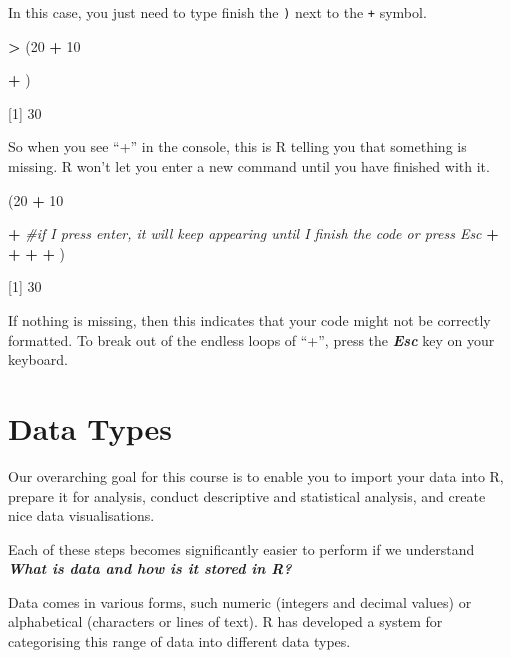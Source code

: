 \documentclass[
]{book}
\newenvironment{Shaded}{\begin{snugshade}}{\end{snugshade}}
\newcommand{\CommentTok}[1]{\textcolor[rgb]{0.56,0.35,0.01}{\textit{#1}}}
\newcommand{\DecValTok}[1]{\textcolor[rgb]{0.00,0.00,0.81}{#1}}
\newcommand{\NormalTok}[1]{#1}
\newcommand{\SpecialCharTok}[1]{\textcolor[rgb]{0.81,0.36,0.00}{\textbf{#1}}}
\begin{document}
In this case, you just need to type finish the \texttt{)} next to the \texttt{+} symbol.

\begin{Shaded}
\begin{Highlighting}[]
\SpecialCharTok{\textgreater{}}\NormalTok{ (}\DecValTok{20} \SpecialCharTok{+} \DecValTok{10}
 
\SpecialCharTok{+}\NormalTok{ )}

\NormalTok{[}\DecValTok{1}\NormalTok{] }\DecValTok{30}
\end{Highlighting}
\end{Shaded}

So when you see ``+'' in the console, this is R telling you that something is missing. R won't let you enter a new command until you have finished with it.

\begin{Shaded}
\begin{Highlighting}[]
\NormalTok{(}\DecValTok{20} \SpecialCharTok{+} \DecValTok{10}

\SpecialCharTok{+} \CommentTok{\#if I press enter, it will keep appearing until I finish the code or press Esc}
\SpecialCharTok{+}
\SpecialCharTok{+}
\SpecialCharTok{+}
\SpecialCharTok{+}\NormalTok{ )}

\NormalTok{[}\DecValTok{1}\NormalTok{] }\DecValTok{30}
\end{Highlighting}
\end{Shaded}

If nothing is missing, then this indicates that your code might not be correctly formatted. To break out of the endless loops of ``+'', press the \textbf{\emph{Esc}} key on your keyboard.

\section{Data Types}\label{data-types}

Our overarching goal for this course is to enable you to import your data into R, prepare it for analysis, conduct descriptive and statistical analysis, and create nice data visualisations.

Each of these steps becomes significantly easier to perform if we understand \textbf{\emph{What is data and how is it stored in R?}}

Data comes in various forms, such numeric (integers and decimal values) or alphabetical (characters or lines of text). R has developed a system for categorising this range of data into different data types.
\end{document}
